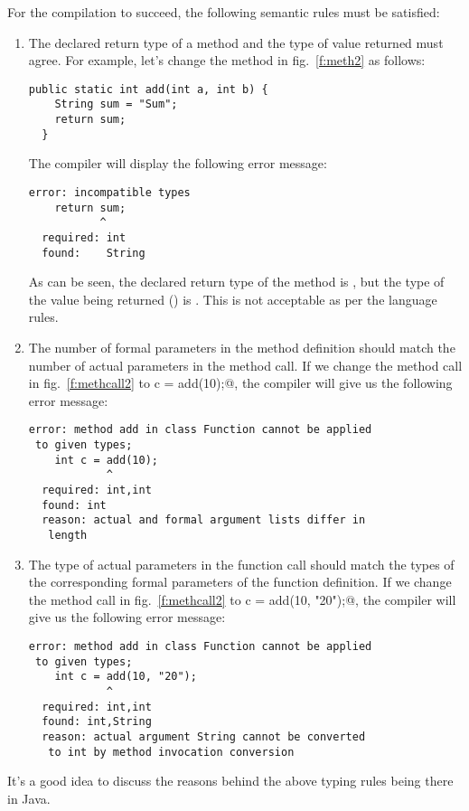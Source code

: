 \documentclass[12pt,a4paper]{article}
\begin{document}
For the compilation to succeed, the following semantic rules must be satisfied:
\begin{enumerate}
	\item The declared return type of a method and the type of value returned must agree. For example, let's change the method \lstinline@add@ in fig.~\ref{f:meth2} as follows:
\begin{lstlisting}[frame=single]
  public static int add(int a, int b) {
    String sum = "Sum";
    return sum;
  }
\end{lstlisting}
The compiler will display the following error message:
\begin{lstlisting}[frame=single]
error: incompatible types
    return sum;
           ^
  required: int
  found:    String
\end{lstlisting}
As can be seen, the declared return type of the method is \lstinline@int@, but the type of the value being returned (\lstinline@sum@) is \lstinline@String@. This is not acceptable as per the language rules.
\item The number of formal parameters in the method definition should match the number of actual parameters in the method call. If we change the method call in fig.~\ref{f:methcall2} to  \lstinline@int c = add(10);@, the compiler will give us the following error message:
\begin{lstlisting}[frame=single]
error: method add in class Function cannot be applied
 to given types;
    int c = add(10);
            ^
  required: int,int
  found: int
  reason: actual and formal argument lists differ in
   length
\end{lstlisting}
\item The type of actual parameters in the function call should match the types of the corresponding formal parameters of the function definition.
 If we change the method call in fig.~\ref{f:methcall2} to  \lstinline@int c = add(10, "20");@, the compiler will give us the following error message:
\begin{lstlisting}[frame=single]
error: method add in class Function cannot be applied
 to given types;
    int c = add(10, "20");
            ^
  required: int,int
  found: int,String
  reason: actual argument String cannot be converted
   to int by method invocation conversion
\end{lstlisting}

\end{enumerate}
It's a good idea to discuss the reasons behind the above typing rules being there in Java.
\end{document}
